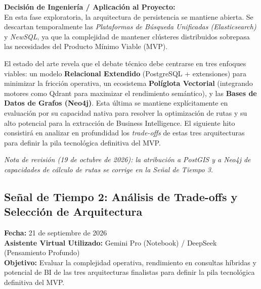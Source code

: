 \textbf{Decisión de Ingeniería / Aplicación al Proyecto:} \\
En esta fase exploratoria, la arquitectura de persistencia se mantiene abierta. Se descartan temporalmente las \textit{Plataformas de Búsqueda Unificadas (Elasticsearch)} y \textit{NewSQL}, ya que la complejidad de mantener clústeres distribuidos sobrepasa las necesidades del Producto Mínimo Viable (MVP). 

El estado del arte revela que el debate técnico debe centrarse en tres enfoques viables: un modelo \textbf{Relacional Extendido} (PostgreSQL + extensiones) para minimizar la fricción operativa, un ecosistema \textbf{Políglota Vectorial} (integrando motores como Qdrant para maximizar el rendimiento semántico), y las \textbf{Bases de Datos de Grafos (Neo4j)}. Esta última se mantiene explícitamente en evaluación por su capacidad nativa para resolver la optimización de rutas y su alto potencial para la extracción de Business Intelligence. 
El siguiente hito consistirá en analizar en profundidad los \textit{trade-offs} de estas tres arquitecturas para definir la pila tecnológica definitiva del MVP.

\textit{Nota de revisión (19 de octubre de 2026): la atribución a PostGIS y a Neo4j de capacidades de cálculo de rutas se corrige en la Señal de Tiempo 3.}

\vspace{0.5cm}

\subsection{Señal de Tiempo 2: Análisis de Trade-offs y Selección de Arquitectura}
\textbf{Fecha:} 21 de septiembre de 2026 \\
\textbf{Asistente Virtual Utilizado:} Gemini Pro (Notebook) / DeepSeek (Pensamiento Profundo) \\
\textbf{Objetivo:} Evaluar la complejidad operativa, rendimiento en consultas híbridas y potencial de BI de las tres arquitecturas finalistas para definir la pila tecnológica definitiva del MVP.

